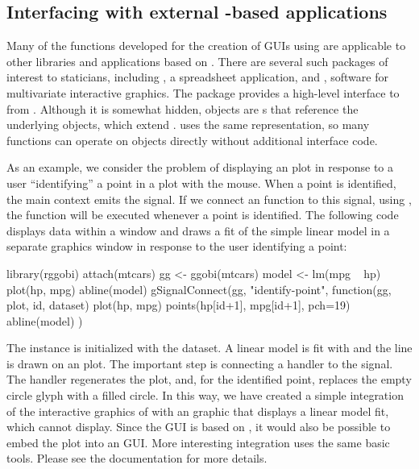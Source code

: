 \documentclass[article,shortnames]{jss}
\begin{document}
\subsection[Interfacing with external GObject-based
applications]{Interfacing with external -based
applications}

Many of the  functions developed for the creation of GUIs
using  are applicable to other libraries and applications
based on . There are several such packages of interest to
staticians, including , a spreadsheet application, and
, software for multivariate interactive graphics. The
 package \citep{rggobi} provides a high-level interface to
 from . Although it is somewhat hidden,
 objects are s that reference the
underlying  objects, which extend
.  uses the same  representation,
so many  functions can operate on  objects
directly without additional interface code.

As an example, we consider the problem of displaying an 
plot in response to a user ``identifying'' a point in a 
plot with the mouse. When a  point is identified, the main
 context emits the  signal. If we
connect an  function to this signal, using
, the function will be executed whenever a point
is identified. 
The following code displays data within a  window and
draws a fit of the simple linear model in a separate 
graphics window in response to the user identifying a point:
\begin{Code}
library(rggobi)
attach(mtcars)
gg <- ggobi(mtcars)
model <- lm(mpg ~ hp)
plot(hp, mpg)
abline(model)
gSignalConnect(gg, "identify-point", 
               function(gg, plot, id, dataset) {
                plot(hp, mpg)
                points(hp[id+1], mpg[id+1], pch=19)
                abline(model)
               })
\end{Code}
The  instance is initialized with the 
dataset.  A linear model is fit with  and the line is drawn
on an  plot. The important step is connecting a handler to
the  signal. The handler regenerates the
 plot, and, for the identified point, replaces the empty
circle glyph with a filled circle.  In this way, we have created a
simple integration of the interactive
graphics of  with an  graphic that displays a
linear model fit, which  cannot display. Since the
 GUI is based on , it would also be possible to
embed the  plot into an  GUI. More interesting
integration uses the same basic tools. Please see the 
documentation for more details.
\end{document}
